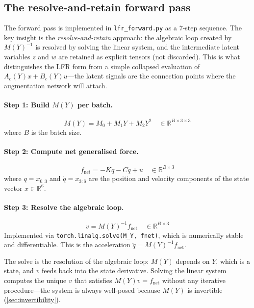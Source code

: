 \documentclass[11pt,a4paper]{article}
\newcommand{\R}{\mathbb{R}}
\newcommand{\inv}{^{-1}}
\newcommand{\qdot}{\dot{q}}
\newcommand{\qddot}{\ddot{q}}
\newcommand{\pyfile}[1]{\texttt{#1}}
\begin{document}
\subsection{The resolve-and-retain forward pass}
\label{sec:forward_pass}

The forward pass is implemented in \pyfile{lfr\_forward.py} as a 7-step sequence. The key
insight is the \emph{resolve-and-retain} approach: the algebraic loop created by $M(Y)\inv$
is resolved by solving the linear system, and the intermediate latent variables $z$ and $w$
are retained as explicit tensors (not discarded). This is what distinguishes the LFR form from
a simple collapsed evaluation of $A_c(Y) x + B_c(Y) u$---the latent signals are the
connection points where the augmentation network will attach.

\paragraph{Step 1: Build $M(Y)$ per batch.}
\begin{equation}
M(Y) = M_0 + M_1 Y + M_2 Y^2 \quad \in \R^{B \times 3 \times 3}
\end{equation}
where $B$ is the batch size.

\paragraph{Step 2: Compute net generalised force.}
\begin{equation}
f_{\text{net}} = -K q - C \qdot + u \quad \in \R^{B \times 3}
\end{equation}
where $q = x_{0:3}$ and $\qdot = x_{3:6}$ are the position and velocity components of the
state vector $x \in \R^6$.

\paragraph{Step 3: Resolve the algebraic loop.}
\begin{equation}
\label{eq:v_solve}
v = M(Y)\inv f_{\text{net}} \quad \in \R^{B \times 3}
\end{equation}
Implemented via \texttt{torch.linalg.solve(M\_Y, fnet)}, which is numerically stable and
differentiable. This is the acceleration $\qddot = M(Y)\inv f_{\text{net}}$.

The solve is the resolution of the algebraic loop: $M(Y)$ depends on $Y$, which is a state,
and $v$ feeds back into the state derivative. Solving the linear system computes the
unique $v$ that satisfies $M(Y) v = f_{\text{net}}$ without any iterative procedure---the
system is always well-posed because $M(Y)$ is invertible (\cref{sec:invertibility}).
\end{document}

